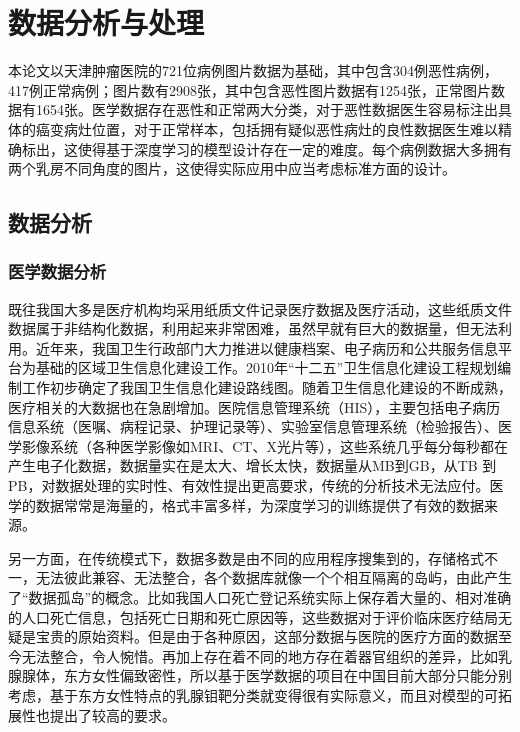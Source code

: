 \chapter{数据分析与处理}\label{chap:data}
本论文以天津肿瘤医院的721位病例图片数据为基础，其中包含304例恶性病例，417例正常病例；图片数有2908张，其中包含恶性图片数据有1254张，正常图片数据有1654张。医学数据存在恶性和正常两大分类，对于恶性数据医生容易标注出具体的癌变病灶位置，对于正常样本，包括拥有疑似恶性病灶的良性数据医生难以精确标出，这使得基于深度学习的模型设计存在一定的难度。每个病例数据大多拥有两个乳房不同角度的图片，这使得实际应用中应当考虑标准方面的设计。

\section{数据分析}
\subsection{医学数据分析}
既往我国大多是医疗机构均采用纸质文件记录医疗数据及医疗活动，这些纸质文件数据属于非结构化数据，利用起来非常困难，虽然早就有巨大的数据量，但无法利用。近年来，我国卫生行政部门大力推进以健康档案、电子病历和公共服务信息平台为基础的区域卫生信息化建设工作。2010年“十二五”卫生信息化建设工程规划编制工作初步确定了我国卫生信息化建设路线图。随着卫生信息化建设的不断成熟，医疗相关的大数据也在急剧增加。医院信息管理系统（HIS），主要包括电子病历信息系统（医嘱、病程记录、护理记录等）、实验室信息管理系统（检验报告）、医学影像系统（各种医学影像如MRI、CT、X光片等），这些系统几乎每分每秒都在产生电子化数据，数据量实在是太大、增长太快，数据量从MB到GB，从TB 到PB，对数据处理的实时性、有效性提出更高要求，传统的分析技术无法应付。医学的数据常常是海量的，格式丰富多样，为深度学习的训练提供了有效的数据来源。

另一方面，在传统模式下，数据多数是由不同的应用程序搜集到的，存储格式不一，无法彼此兼容、无法整合，各个数据库就像一个个相互隔离的岛屿，由此产生了“数据孤岛”的概念。比如我国人口死亡登记系统实际上保存着大量的、相对准确的人口死亡信息，包括死亡日期和死亡原因等，这些数据对于评价临床医疗结局无疑是宝贵的原始资料。但是由于各种原因，这部分数据与医院的医疗方面的数据至今无法整合，令人惋惜。再加上存在着不同的地方存在着器官组织的差异，比如乳腺腺体，东方女性偏致密性，所以基于医学数据的项目在中国目前大部分只能分别考虑，基于东方女性特点的乳腺钼靶分类就变得很有实际意义，而且对模型的可拓展性也提出了较高的要求。

